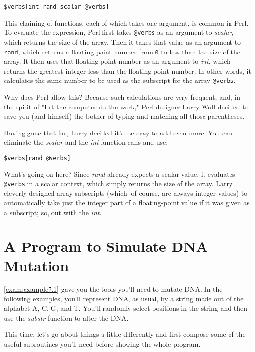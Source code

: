 \begin{lstlisting}
$verbs[int rand scalar @verbs]
\end{lstlisting}

This chaining of functions, each of which takes one argument, is common in Perl. To evaluate the expression, Perl first takes \verb|@verbs| as an argument to \textit{scalar}, which returns the size of the array. Then it takes that value as an argument to \verb|rand|, which returns a floating-point number from \verb|0| to less than the size of the array. It then uses that floating-point number as an argument to \textit{int}, which returns the greatest integer less than the floating-point number. In other words, it calculates the same number to be used as the subscript for the array \verb|@verbs|.

Why does Perl allow this? Because such calculations are very frequent, and, in the spirit of "Let the computer do the work," Perl designer Larry Wall decided to save you (and himself) the bother of typing and matching all those parentheses.

Having gone that far, Larry decided it'd be easy to add even more. You can eliminate the \textit{scalar} and the \textit{int} function calls and use:

\begin{lstlisting}
$verbs[rand @verbs]
\end{lstlisting}

What's going on here? Since \textit{rand} already expects a scalar value, it evaluates \verb|@verbs| in a scalar context, which simply returns the size of the array. Larry cleverly designed array subscripts (which, of course, are always integer values) to automatically take just the integer part of a floating-point value if it was given as a subscript; so, out with the \textit{int}. 

\section{A Program to Simulate DNA Mutation}
\autoref{exam:example7.1} gave you the tools you'll need to mutate DNA. In the following examples, you'll represent DNA, as usual, by a string made out of the alphabet A, C, G, and T. You'll randomly select positions in the string and then use the \textit{substr} function to alter the DNA.

This time, let's go about things a little differently and first compose some of the useful subroutines you'll need before showing the whole program. 

